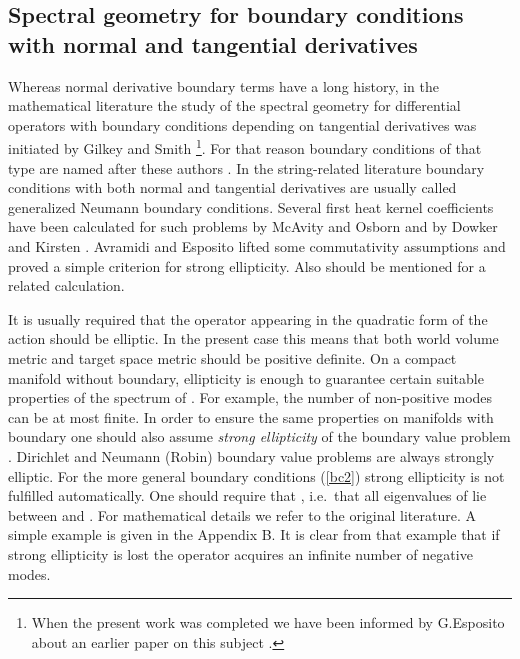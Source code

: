\documentclass[a4paper,12pt]{article}
\begin{document}
\subsection{Spectral geometry for boundary conditions with normal and
tangential derivatives}\label{ellipt}

Whereas normal derivative boundary terms have a long 
history, in the mathematical literature the 
study of the spectral geometry for differential operators with
boundary conditions depending on tangential
derivatives was initiated by Gilkey and Smith \cite{GilkeySmith}
\footnote{When the present work was completed 
we have been informed by G.Esposito about an earlier paper
on this subject \cite{Grubb}.}.
For that reason boundary conditions of that type are 
named after these authors \cite{AvEs3}. In the string-related literature
boundary conditions with both normal and tangential derivatives
are usually called generalized Neumann boundary conditions.
Several
first heat kernel coefficients have been calculated for such 
problems  by 
McAvity and Osborn \cite{McO} and by Dowker and Kirsten \cite{DK}.
Avramidi and Esposito \cite{AEearlier,AE,AvEs,AvEs3} lifted some commutativity
assumptions and proved a simple criterion for strong
ellipticity. Also \cite{EV} should be mentioned for a related calculation.

It is usually required that the operator \coordHE{} appearing in the
quadratic form of the action should be elliptic. In the present case
this means that both world volume metric and target space metric
should be positive definite. On a compact manifold without 
boundary, 
ellipticity is enough to guarantee certain suitable properties of the
spectrum of \coordHE{}. For example, the number of non-positive modes 
can be at most finite. In order to ensure
the same properties on manifolds with boundary one should also
assume {\it strong ellipticity}
of the boundary value problem \cite{Gilkey}. Dirichlet and
Neumann (Robin) boundary value problems are
always strongly elliptic. For the more general boundary conditions (\ref{bc2})
strong ellipticity is not fulfilled automatically. One should require
that \coordHE{}, i.e.\ that  all eigenvalues of \myHighlight{$\Gamma$}\coordHE{} lie 
between \coordHE{} and \coordHE{} \cite{AvEs,AvEs3}. For mathematical
details we refer to the original literature. A simple example is
given in the Appendix B. It is clear from that example that if
strong ellipticity is lost the operator \coordHE{} acquires 
 an infinite number of negative modes. 
\end{document}

